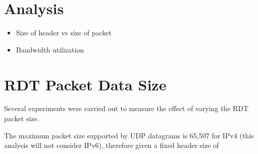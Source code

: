 \section{Analysis}

\begin{itemize}
    \item Size of header vs size of packet
    \item Bandwidth utilization
\end{itemize}

\section{RDT Packet Data Size}

Several experiments were carried out to measure the effect of varying the RDT packet size. 

The maximum packet size supported by UDP datagrams is 65,507 for IPv4 (this analysis will not consider IPv6), therefore given a fixed header size of 